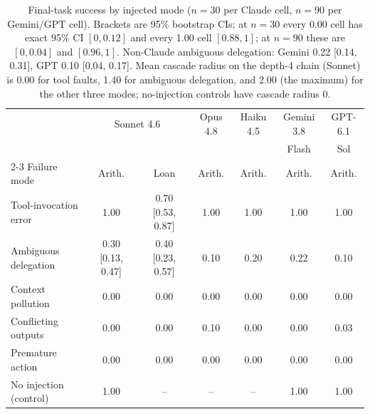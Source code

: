 \documentclass[11pt,a4paper]{article}
\begin{document}
\begin{table}[htbp]
  \centering
  \small
  \setlength{\tabcolsep}{4pt}
  \begin{tabularx}{\linewidth}{@{}Xcccccc@{}}
    \toprule
    & \multicolumn{2}{c}{Sonnet 4.6} & Opus 4.8 & Haiku 4.5 & Gemini 3.8 & GPT-6.1 \\
    & & & & & Flash & Sol \\
    \cmidrule(lr){2-3}
    Failure mode & Arith. & Loan & Arith. & Arith. & Arith. & Arith. \\
    \midrule
    Tool-invocation error & 1.00 & 0.70 [0.53, 0.87] & 1.00 & 1.00 & 1.00 & 1.00 \\
    Ambiguous delegation & 0.30 [0.13, 0.47] & 0.40 [0.23, 0.57] & 0.10 & 0.20 & 0.22 & 0.10 \\
    Context pollution & 0.00 & 0.00 & 0.00 & 0.00 & 0.00 & 0.00 \\
    Conflicting outputs & 0.00 & 0.00 & 0.10 & 0.00 & 0.00 & 0.03 \\
    Premature action & 0.00 & 0.00 & 0.00 & 0.00 & 0.00 & 0.00 \\
    \midrule
    No injection (control) & 1.00 & -- & -- & -- & 1.00 & 1.00 \\
    \bottomrule
  \end{tabularx}
  \caption{Final-task success by injected mode ($n{=}30$ per Claude cell,
  $n{=}90$ per Gemini/GPT cell). Brackets are 95\% bootstrap CIs; at $n{=}30$
  every 0.00 cell has exact 95\% CI $[0, 0.12]$ and every 1.00 cell
  $[0.88, 1]$; at $n{=}90$ these are $[0, 0.04]$ and $[0.96, 1]$. Non-Claude
  ambiguous delegation: Gemini 0.22 [0.14, 0.31], GPT 0.10 [0.04, 0.17].
  Mean cascade radius on the depth-4 chain (Sonnet) is 0.00 for tool faults,
  1.40 for ambiguous delegation, and 2.00 (the maximum) for the other three
  modes; no-injection controls have cascade radius 0.}
  \label{tab:exp2}
\end{table}
\end{document}
